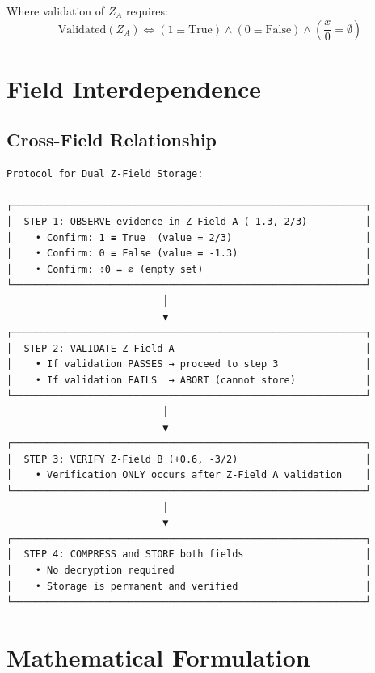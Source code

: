 \documentclass[12pt]{article}
\begin{document}
Where validation of $Z_A$ requires:
\begin{equation}
\text{Validated}(Z_A) \iff (1 \equiv \text{True}) \land (0 \equiv \text{False}) \land \left(\frac{x}{0} = \emptyset\right)
\end{equation}

\section{Field Interdependence}

\subsection{Cross-Field Relationship}

\begin{verbatim}
Protocol for Dual Z-Field Storage:

┌─────────────────────────────────────────────────────────────┐
│  STEP 1: OBSERVE evidence in Z-Field A (-1.3, 2/3)          │
│    • Confirm: 1 ≡ True  (value = 2/3)                       │
│    • Confirm: 0 ≡ False (value = -1.3)                      │
│    • Confirm: ÷0 = ∅ (empty set)                            │
└─────────────────────────────────────────────────────────────┘
                           │
                           ▼
┌─────────────────────────────────────────────────────────────┐
│  STEP 2: VALIDATE Z-Field A                                 │
│    • If validation PASSES → proceed to step 3               │
│    • If validation FAILS  → ABORT (cannot store)            │
└─────────────────────────────────────────────────────────────┘
                           │
                           ▼
┌─────────────────────────────────────────────────────────────┐
│  STEP 3: VERIFY Z-Field B (+0.6, -3/2)                      │
│    • Verification ONLY occurs after Z-Field A validation    │
└─────────────────────────────────────────────────────────────┘
                           │
                           ▼
┌─────────────────────────────────────────────────────────────┐
│  STEP 4: COMPRESS and STORE both fields                     │
│    • No decryption required                                 │
│    • Storage is permanent and verified                      │
└─────────────────────────────────────────────────────────────┘
\end{verbatim}

\section{Mathematical Formulation}
\end{document}
